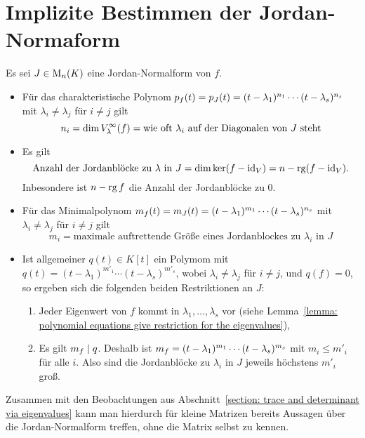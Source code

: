 \section{Implizite Bestimmen der Jordan-Normaform}

Es sei $J \in \operatorname{M}_{n}(K)$ eine Jordan-Normalform von $f$.
\begin{itemize}
  \item
    Für das charakteristische Polynom $p_{f}(t) = p_{J}(t) = (t - \lambda_1)^{n_1} \dotsm (t - \lambda_s)^{n_s}$ mit $\lambda_i \neq \lambda_j$ für $i \neq j$ gilt
    \[
        n_i
      = \dim V_{\lambda}^{\infty}(f)
      = \text{wie oft $\lambda_i$ auf der Diagonalen von $J$ steht}
    \]
  \item
    Es gilt
    \[
        \text{Anzahl der Jordanblöcke zu $\lambda$ in $J$}
      = \dim \ker (f - \operatorname{id}_V)
      = n - \operatorname{rg} (f - \operatorname{id}_V).
    \]
    Inbesondere ist $n - \operatorname{rg} f$ die Anzahl der Jordanblöcke zu $0$.
  \item
    Für das Minimalpolynom $m_{f}(t) = m_{J}(t) = (t - \lambda_1)^{m_1} \dotsm (t - \lambda_s)^{n_s}$ mit $\lambda_i \neq \lambda_j$ für $i \neq j$ gilt
    \[
        m_i
      = \text{maximale auftrettende Größe eines Jordanblockes zu $\lambda_i$ in $J$}
    \]
  \item
    Ist allgemeiner $q(t) \in K[t]$ ein Polymom mit $q(t) = (t - \lambda_1)^{m'_1} \dotsm (t - \lambda_s)^{m'_s}$, wobei $\lambda_i \neq \lambda_j$ für $i \neq j$, und $q(f) = 0$, so ergeben sich die folgenden beiden Restriktionen an $J$:
    \begin{enumerate}
      \item
        Jeder Eigenwert von $f$ kommt in $\lambda_1, \dotsc, \lambda_s$ vor (siehe Lemma~\ref{lemma: polynomial equations give restriction for the eigenvalues}),
      \item
        Es gilt $m_{f} \mid q$.
        Deshalb ist $m_{f} = (t - \lambda_1)^{m_1} \dotsm (t - \lambda_s)^{m_s}$ mit $m_i \leq m'_i$ für alle $i$.
        Also sind die Jordanblöcke zu $\lambda_i$ in $J$ jeweils höchstens $m'_i$ groß.
    \end{enumerate}
\end{itemize}

Zusammen mit den Beobachtungen aus Abschnitt~\ref{section: trace and determinant via eigenvalues} kann man hierdurch für kleine Matrizen bereits Aussagen über die Jordan-Nor\-mal\-form treffen, ohne die Matrix selbst zu kennen.

